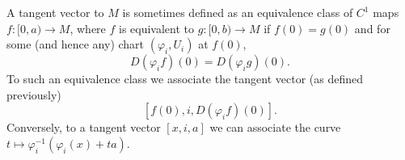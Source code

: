 A tangent vector to $M$ is sometimes defined as an equivalence class of $C^1$ maps $f: [0,a) \to M$, where $f$ is equivalent to $g: [0,b) \to M$ if $f(0) = g(0)$ and for some (and hence any) chart $(\varphi_i, U_i)$ at $f(0)$,
$$D(\varphi_i f)(0) = D(\varphi_i g)(0).$$
To such an equivalence class we associate the tangent vector (as defined previously)
$$[f(0), i, D(\varphi_i f)(0)].$$
Conversely, to a tangent vector $[x,i,a]$ we can associate the curve $t \mapsto \varphi_i^{-1}(\varphi_i(x) + ta)$.
